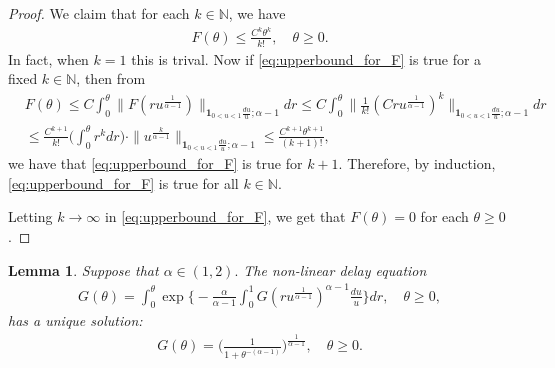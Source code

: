 \documentclass[12pt,a4paper]{amsart}
\newtheorem{lem}[thm]{Lemma}
\theoremstyle{definition}
\numberwithin{equation}{section}
\begin{document}
\begin{proof}
  We claim that for each $k \in \mathbb N$, we have
  \begin{align}
    \label{eq:upperbound_for_F}
    F(\theta) \leq \frac{C^k \theta^k}{k!},
    \quad \theta \geq 0.
  \end{align}
  In fact, when $k = 1$ this is trival. Now if \eqref{eq:upperbound_for_F} is true for a fixed $k \in \mathbb N$, then from
  \begin{align}
    &F(\theta)
      \leq C \int_0^\theta \big\|  F(ru^{ \frac{1}{\alpha - 1}  })\big\|_{\mathbf 1_{0<u<1}\frac{du}{u}; \alpha - 1} dr
      \leq C \int_0^\theta \Big\|  \frac{1}{k!}(Cru^{ \frac{1}{\alpha - 1}  })^k \Big\|_{\mathbf 1_{0<u<1}\frac{du}{u}; \alpha - 1} dr
    \\ &\leq \frac{C^{k+1}}{k!} \Big(\int_0^\theta r^k dr\Big) \cdot \|u^{\frac{k}{\alpha - 1}} \|_{\mathbf 1_{0<u<1}\frac{du}{u}; \alpha - 1} \leq \frac{C^{k+1} \theta^{k+1}}{(k+1)!},
  \end{align}
  we have that \eqref{eq:upperbound_for_F} is true for $k+1$.
  Therefore, by induction, \eqref{eq:upperbound_for_F} is true for all $k \in \mathbb N$.

  Letting $k \to \infty$ in \eqref{eq:upperbound_for_F}, we get that $F(\theta) = 0$ for each $\theta \geq 0$.
\end{proof}

\begin{lem} \label{lem: characterize the general Mittag-Leffler distribution}
  Suppose that $\alpha \in (1,2).$
  The non-linear delay equation
  \begin{align} \label{eq: equation for the distribution}
    G( \theta)
    = \int_0^\theta \exp\Big\{ - \frac{\alpha} {\alpha - 1} \int_0^1 G(ru^{\frac{1}{\alpha - 1} })^{\alpha - 1}\frac{du}{u} \Big\} dr,
    \quad \theta \geq 0,
  \end{align}
	has a unique solution:
  \begin{align}\label{eq: solution for the equation}
    G(\theta)
    = \Big(\frac{1}{1+\theta^{-(\alpha - 1)}}\Big)^{\frac{1}{\alpha - 1}},
    \quad \theta \geq 0.
  \end{align}
\end{lem}
\end{document}
